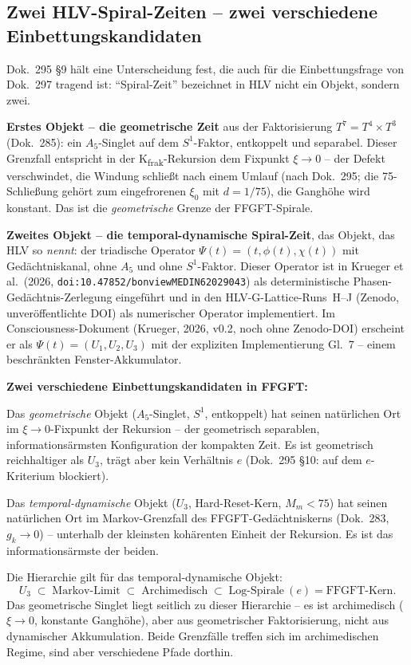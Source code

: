 \subsection*{Zwei HLV-Spiral-Zeiten -- zwei verschiedene Einbettungskandidaten}

Dok.~295 §9 hält eine Unterscheidung fest, die auch für die
Einbettungsfrage von Dok.~297 tragend ist: \enquote{Spiral-Zeit} bezeichnet
in HLV nicht ein Objekt, sondern zwei.

\textbf{Erstes Objekt -- die geometrische Zeit} aus der Faktorisierung
$T^7 = T^4 \times T^3$ (Dok.~285): ein $A_5$-Singlet auf dem $S^1$-Faktor,
entkoppelt und separabel. Dieser Grenzfall entspricht in der
K\textsubscript{frak}-Rekursion dem Fixpunkt $\xi \to 0$ -- der Defekt
verschwindet, die Windung schließt nach einem Umlauf (nach Dok.~295; die 75-Schließung gehört zum eingefrorenen $\xi_0$ mit
$d=1/75$), die Ganghöhe wird
konstant. Das ist die \emph{geometrische} Grenze der FFGFT-Spirale.

\textbf{Zweites Objekt -- die temporal-dynamische Spiral-Zeit}, das Objekt,
das HLV so \emph{nennt}: der triadische Operator
$\Psi(t) = (t, \phi(t), \chi(t))$ mit Gedächtniskanal, ohne $A_5$ und
ohne $S^1$-Faktor. Dieser Operator ist in Krueger et al.\ (2026,
\texttt{doi:10.47852/bonviewMEDIN62029043}) als deterministische
Phasen-Gedächtnis-Zerlegung eingeführt und in den HLV-G-Lattice-Runs~H--J
(Zenodo, unveröffentlichte DOI) als numerischer Operator implementiert.
Im Consciousness-Dokument (Krueger, 2026, v0.2, noch ohne Zenodo-DOI)
erscheint er als $\Psi(t) = (U_1, U_2, U_3)$ mit der expliziten
Implementierung Gl.~7 -- einem beschränkten Fenster-Akkumulator.

\textbf{Zwei verschiedene Einbettungskandidaten in FFGFT:}

Das \emph{geometrische} Objekt ($A_5$-Singlet, $S^1$, entkoppelt) hat
seinen natürlichen Ort im $\xi \to 0$-Fixpunkt der Rekursion -- der
geometrisch separablen, informationsärmsten Konfiguration der kompakten
Zeit. Es ist geometrisch reichhaltiger als $U_3$, trägt aber kein
Verhältnis $e$ (Dok.~295 §10: auf dem $e$-Kriterium blockiert).

Das \emph{temporal-dynamische} Objekt ($U_3$, Hard-Reset-Kern, $M_m < 75$)
hat seinen natürlichen Ort im Markov-Grenzfall des FFGFT-Gedächtniskerns
(Dok.~283, $g_k \to 0$) -- unterhalb der kleinsten kohärenten Einheit der
Rekursion. Es ist das informationsärmste der beiden.

Die Hierarchie gilt für das temporal-dynamische Objekt:
\[
  U_3 \;\subset\; \text{Markov-Limit} \;\subset\;
  \text{Archimedisch} \;\subset\; \text{Log-Spirale}~(e)
  = \text{FFGFT-Kern}.
\]
Das geometrische Singlet liegt seitlich zu dieser Hierarchie -- es ist
archimedisch ($\xi \to 0$, konstante Ganghöhe), aber aus geometrischer
Faktorisierung, nicht aus dynamischer Akkumulation. Beide Grenzfälle
treffen sich im archimedischen Regime, sind aber verschiedene Pfade
dorthin.

